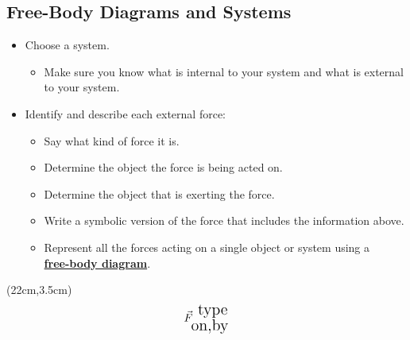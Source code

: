 \documentclass[]{article}
\begin{document}
\begin{PresentSpace}
\vspace{-10pt}
\section*{Free-Body Diagrams and Systems}
\vspace{-10pt}
\begin{itemize}
	\item Choose a system.
	\begin{itemize}
		\large
		\item Make sure you know what is internal to your system and what is external to your system.
	\end{itemize}
	\item Identify and describe each external force:
	\begin{itemize}
		\large
		\item Say what kind of force it is.
		\item Determine the object the force is being acted on.
		\item Determine the object that is exerting the force.
		\item Write a symbolic version of the force that includes the information above.
		\item Represent all the forces acting on a single object or system using a \\
		\textbf{\underline{free-body diagram}}.
	\end{itemize}
\end{itemize}
\end{PresentSpace}
\begin{textblock*}{5cm}(22cm,3.5cm)
	\Huge
	\[
	\vec{F}^{\text{\Large\ type}}_{\text{\Large on,by}}
	\]
\end{textblock*}
\newpage
\begin{TeacherMargin}

\end{TeacherMargin}
\end{document}
